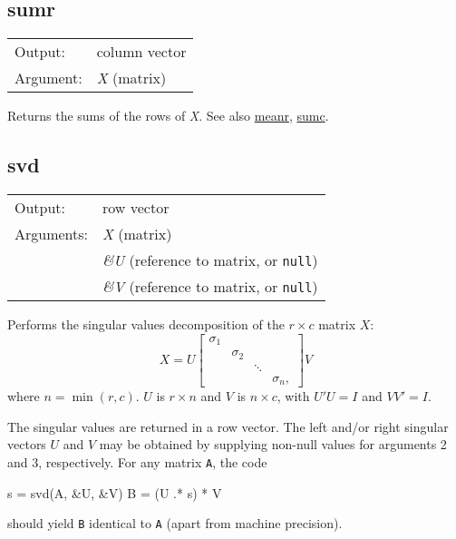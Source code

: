 \subsection{sumr}
\hypertarget{func-sumr}{}

\begin{tabular}{ll}
Output:     & column vector\\
Argument:   & \textsl{X} (matrix)\\
\end{tabular}

	  Returns the sums of the rows of \textsl{X}.
	  See also \hyperlink{func-meanr}{meanr}, \hyperlink{func-sumc}{sumc}.

\subsection{svd}
\hypertarget{func-svd}{}

\begin{tabular}{ll}
Output:     & row vector\\
Arguments:  & \textsl{X} (matrix)\\
           & \textsl{\&U} (reference to matrix, or \texttt{null})\\
           & \textsl{\&V} (reference to matrix, or \texttt{null})\\
\end{tabular}

	  Performs the singular values decomposition of the $r \times c$
	  matrix $X$: 
	  \[ X = U \left[
	  \begin{array}{cccc} 
	  \sigma_1 \\ 
	  & \sigma_2 \\ 
	  & & \ddots \\ 
	  & & & \sigma_n ,
	  \end{array}
	  \right] V \] 
	  where $n = \min(r,c)$. $U$ is $r \times
	  n$ and $V$ is $n \times c$, with $U'U = I$ and $VV' = I$.

	  The singular values are returned in a row vector.  The left
	  and/or right singular vectors \ensuremath{U} and \ensuremath{V}
	  may be obtained by supplying non-null values for arguments 2 and
	  3, respectively.  For any matrix \texttt{A}, the code

\begin{code}
	  s = svd(A, &U, &V) 
	  B = (U .* s) * V

\end{code}

	  should yield \texttt{B} identical to \texttt{A} (apart from
	  machine precision).

